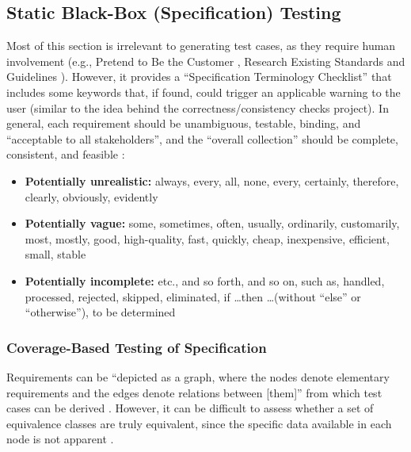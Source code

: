 \subsection{Static Black-Box (Specification) Testing
      \citep[pp.~56-62]{Patton2006}}

Most of this section is irrelevant to generating test cases, as they require
human involvement  (e.g., Pretend to Be the Customer
\citep[pp.~57-58]{Patton2006}, Research Existing Standards and
Guidelines \citep[pp.~58-59]{Patton2006}). However, it provides a
``Specification Terminology Checklist'' \citep[p.~61]{Patton2006} that
includes some keywords that, if found, could trigger an applicable warning to
the user (similar to the idea behind the correctness/consistency checks
project). In general, each requirement should be unambiguous, testable,
binding, and ``acceptable to all stakeholders'', and the ``overall collection''
should be complete, consistent, and feasible \cite[p.~1-8]{SWEBOK2024}:

\begin{itemize}
      \item \textbf{Potentially unrealistic:} always, every, all, none, every,
            certainly, therefore, clearly, obviously, evidently
      \item \textbf{Potentially vague:} some, sometimes, often, usually,
            ordinarily, customarily, most, mostly, good, high-quality, fast,
            quickly, cheap, inexpensive, efficient, small, stable
      \item \textbf{Potentially incomplete:} etc., and so forth, and so on,
            such as, handled, processed, rejected, skipped, eliminated,
            if \dots then \dots (without ``else'' or ``otherwise''),
            to be determined \citep[p.~408]{vanVliet2000}
\end{itemize}

\subsubsection{Coverage-Based Testing of Specification
      \citep[pp.~425-426]{vanVliet2000}}

Requirements can be ``depicted as a graph, where the nodes denote elementary
requirements and the edges denote relations between [them]'' from which test
cases can be derived \citep[p.~425]{vanVliet2000}. However, it can
be difficult to assess whether a set of equivalence classes are truly
equivalent, since the specific data available in each node is not apparent
\citep[p.~426]{vanVliet2000}.


